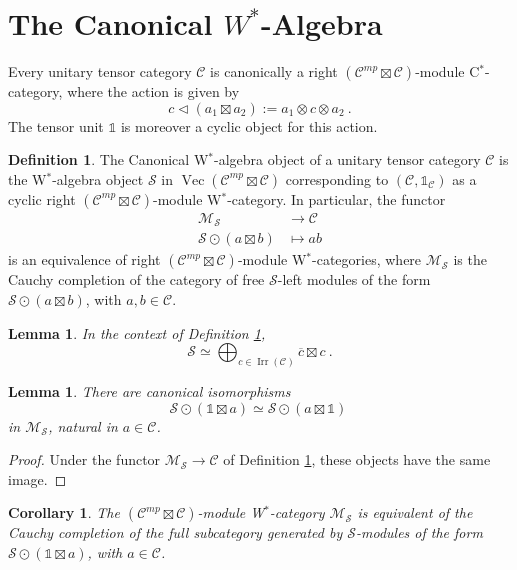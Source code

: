 \documentclass[a4paper,11pt,reqno]{amsart}
\numberwithin{equation}{section}
\newtheorem{corollary}[theorem]{Corollary}
\newtheorem{lemma}[theorem]{Lemma}
\theoremstyle{remark}
\theoremstyle{definition}
\newtheorem{definition}[theorem]{Definition}
\newcommand{\cC}{\mathcal C}
\newcommand{\cM}{\mathcal M}
\newcommand{\cS}{\mathcal S}
\newcommand{\mpcC}{\cC^{mp}}
\DeclareMathOperator{\Irr}{Irr}
\DeclareMathOperator{\Vect}{Vec}
\newcommand\un{{\mathds 1}}
\begin{document}
\section{The Canonical $W^*$-Algebra}

Every unitary tensor category $\cC$ is canonically a right $(\mpcC \boxtimes \cC)$-module C$^*$-category, where the action is given by
\[ c \triangleleft (a_1 \boxtimes a_2) := a_1 \otimes c \otimes a_2 \ . \]
The tensor unit $\un$ is moreover a cyclic object for this action.


\begin{definition}
    The Canonical W$^*$-algebra object of a unitary tensor category $\cC$ is the W$^*$-algebra object $\cS$ in $\Vect(\mpcC \boxtimes \cC)$ corresponding to $(\cC, \un_\cC)$ as a cyclic right $(\mpcC \boxtimes \cC)$-module W$^*$-category. In particular, the functor
    \begin{align*}
        \cM_\cS & \to \cC \\
        \cS  \odot (a \boxtimes b) & \mapsto ab
    \end{align*}
    is an equivalence of right $(\mpcC \boxtimes \cC)$-module W$^*$-categories, where $\cM_\cS$ is the Cauchy completion of the category of free $\cS$-left modules of the form $\cS \odot (a \boxtimes b)$, with $a,b \in \cC$.
    \label{def:SEalgebra}
\end{definition}

\begin{lemma}
    In the context of Definition \ref{def:SEalgebra}, 
    \[ \cS \simeq \bigoplus_{c \in \Irr(\cC)} \overline{c} \boxtimes c \ . \]
    \label{lem:explicitpresentationSEalgebra}
\end{lemma}

\begin{lemma}
    There are canonical isomorphisms
    \[ \cS \odot (\un \boxtimes a) \simeq \cS \odot (a \boxtimes \un) \  \]
    in $\cM_\cS$, natural in $a \in \cC$.
    \label{lem:mirrorpropertySE}
\end{lemma}
\begin{proof}
    Under the functor $\cM_\cS \to \cC$ of Definition \ref{def:SEalgebra}, these objects have the same image. 
\end{proof}
\medskip

\begin{corollary}
    The $(\mpcC \boxtimes \cC)$-module W$^*$-category $\cM_\cS$ is equivalent of the Cauchy completion of the full subcategory generated by $\cS$-modules of the form $\cS \odot (\un \boxtimes a)$, with $a \in \cC$. 
\end{corollary}
\end{document}
